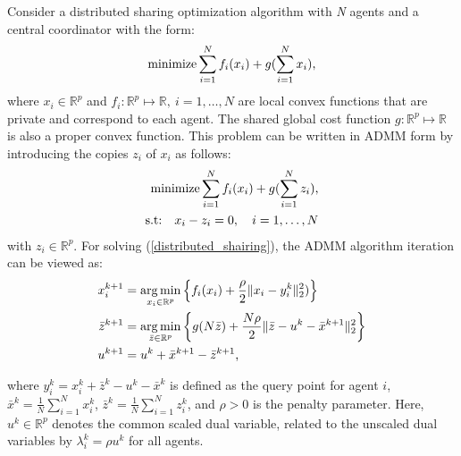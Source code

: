 \documentclass[conference]{IEEEtran}
\DeclareMathOperator*{\argmin}{arg\,min}
\begin{document}
Consider a distributed sharing optimization algorithm with \textit{N} agents and a central coordinator with the form:
\begin{align}
    \text{minimize} \sum_{i=1}^{N} f_i (x_i) + g(\sum_{i=1}^N x_i)\text,
    \label{distributed_shairing}
\end{align}
where $x_i \in \mathbb{R}^p$ and $f_i: \mathbb{R}^p \mapsto \mathbb{R}, \ i = 1, \dots, N$ are local convex functions that are private and correspond to each agent. The shared global cost function $g: \mathbb{R}^p \mapsto \mathbb{R}$ is also a proper convex function. 
This problem can be written in ADMM form by introducing the copies $z_i$ of $x_i$ as follows:
\begin{equation}
    \begin{aligned}
    \text{minimize} \sum_{i=1}^{N} f_i (x_i) + g(\sum_{i=1}^N z_i)\text, \\
    \text{s.t:} \quad x_i - z_i = 0, \quad i = 1, \dots, N
\end{aligned}
\end{equation}
with $z_i \in \mathbb{R}^p$. %
For solving (\ref{distributed_shairing}), the ADMM algorithm iteration can be viewed as:
\begin{equation}
\begin{aligned}
    x_i^{k+1} &= \argmin_{x_i \in \mathbb{R}^p} \left \{ f_i(x_i) + \frac{\rho}{2}\|x_i - y_i^k\|_2^2) \right \} \\
    \bar z^{k+1} &=  \argmin_{\bar z \in \mathbb{R}^p} \left \{ g(N \bar z) + \frac{N\rho}{2}\|\bar z - u^k - \bar x^{k+1}\|_2^2 \right \} \\
    u^{k+1} &=u^k + \bar x^{k+1} - \bar z^{k+1}\text,
\end{aligned}
\label{eq:admm_sharing_algorithm}
\end{equation}

where  $y_i^k = x_i^k  + \bar z^k - u^k - \bar x^k$ is defined as the query point for agent $i$, $\bar{x}^k=\frac{1}{N}\sum_{i=1}^N x_i^k$, $\bar{z}^k=\frac{1}{N}\sum_{i=1}^N z_i^k$, and $\rho>0$ is the penalty parameter. Here, $u^k\in\mathbb{R}^p$ denotes the common scaled dual variable, related to the unscaled dual variables by $\lambda_i^k=\rho u^k$ for all agents.
\end{document}
